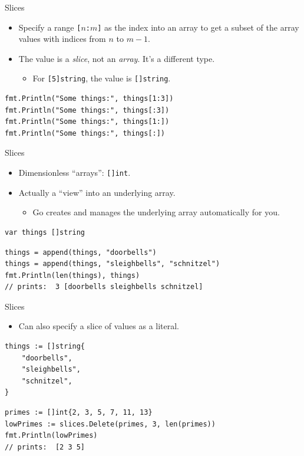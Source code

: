 \documentclass[pdf]{beamer}
\newcommand\z[1]{\texttt{#1}}
\newcommand\keyword[1]{{\color{blue}\z{#1}}}
\begin{document}
\begin{frame}[fragile]{Slices}
    \begin{itemize}
        \item Specify a range \z{[}$n$\z{:}$m$\z{]} as the index into an array to get a subset of the array values
            with indices from $n$ to $m-1$.
        \item The value is a \emph{slice}, not an \emph{array}. It's a different type.
        \begin{itemize}
            \item For \z{[5]}\keyword{string}, the value is \z{[]}\keyword{string}.
        \end{itemize}
    \end{itemize}
\begin{lstlisting}
fmt.Println("Some things:", things[1:3])
fmt.Println("Some things:", things[:3])
fmt.Println("Some things:", things[1:])
fmt.Println("Some things:", things[:])
\end{lstlisting}
\end{frame}
\begin{frame}[fragile]{Slices}
    \begin{itemize}
        \item Dimensionless ``arrays'': \z{[]}\keyword{int}.
        \item Actually a ``view'' into an underlying array.
            \begin{itemize}
                \item Go creates and manages the underlying array automatically for you.
            \end{itemize}
    \end{itemize}
\begin{lstlisting}
var things []string
\end{lstlisting}
\pause
\begin{lstlisting}
things = append(things, "doorbells")
things = append(things, "sleighbells", "schnitzel")
fmt.Println(len(things), things) 
// prints:  3 [doorbells sleighbells schnitzel]
\end{lstlisting}
\end{frame}

\begin{frame}[fragile]{Slices}
    \begin{itemize}
        \item Can also specify a slice of values as a literal.
    \end{itemize}
\begin{lstlisting}
things := []string{
    "doorbells",
    "sleighbells",
    "schnitzel",
}
\end{lstlisting}
\pause
\begin{lstlisting}
primes := []int{2, 3, 5, 7, 11, 13}
lowPrimes := slices.Delete(primes, 3, len(primes))
fmt.Println(lowPrimes)
// prints:  [2 3 5]
\end{lstlisting}
\end{frame}
\end{document}
